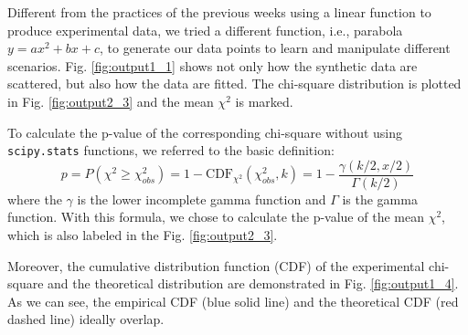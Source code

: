 \documentclass[12pt,a4paper]{article}
\begin{document}
\begin{CJK}{UTF8}{bkai}
Different from the practices of the previous weeks using a linear function to produce experimental data, we tried a different function, i.e., parabola $y=ax^2+bx+c$, to generate our data points to learn and manipulate different scenarios. Fig. \ref{fig:output1_1} shows not only how the synthetic data are scattered, but also how the data are fitted. The chi-square distribution is plotted in Fig. \ref{fig:output2_3} and the mean $\chi^2$ is marked.

To calculate the p-value of the corresponding chi-square without using \texttt{scipy.stats} functions, we referred to the basic definition:
\begin{equation}
    p = P(\chi^2\geq\chi^2_{obs}) = 1 - \text{CDF}_{\chi^2}(\chi^2_{obs}, k)= 1-\frac{\gamma(k/2, x/2)}{\Gamma(k/2)}
\end{equation}
where the $\gamma$ is the lower incomplete gamma function and $\Gamma$ is the gamma function. With this formula, we chose to calculate the p-value of the mean $\chi^2$, which is also labeled in the Fig. \ref{fig:output2_3}.

Moreover, the cumulative distribution function (CDF) of the experimental chi-square and the theoretical distribution are demonstrated in Fig. \ref{fig:output1_4}. As we can see, the empirical CDF (blue solid line) and the theoretical CDF (red dashed line) ideally overlap.


\end{CJK}
\end{document}
